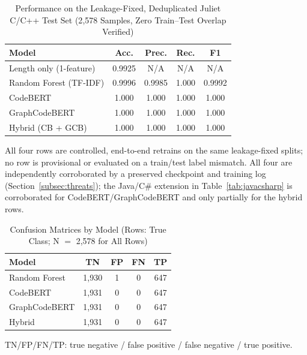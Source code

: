 \documentclass{ieeeaccess}
\begin{document}
\begin{table}[t]
\centering
\caption{Performance on the Leakage-Fixed, Deduplicated Juliet C/C++ Test Set (2{,}578 Samples, Zero Train--Test Overlap Verified)}
\label{tab:cpp-results}
\begin{tabular}{@{}lcccc@{}}
\toprule
\textbf{Model} & \textbf{Acc.} & \textbf{Prec.} & \textbf{Rec.} & \textbf{F1} \\
\midrule
Length only (1-feature)  & 0.9925 & N/A    & N/A   & N/A    \\
Random Forest (TF-IDF)    & 0.9996 & 0.9985 & 1.000 & 0.9992 \\
CodeBERT                  & 1.000  & 1.000  & 1.000 & 1.000  \\
GraphCodeBERT             & 1.000  & 1.000  & 1.000 & 1.000  \\
Hybrid (CB + GCB)         & 1.000  & 1.000  & 1.000 & 1.000  \\
\bottomrule
\end{tabular}

\vspace{2pt}
{\footnotesize All four rows are controlled, end-to-end retrains on the same leakage-fixed splits; no row is provisional or evaluated on a train/test label mismatch. All four are independently corroborated by a preserved checkpoint and training log (Section~\ref{subsec:threats}); the Java/C\# extension in Table~\ref{tab:javacsharp} is corroborated for CodeBERT/GraphCodeBERT and only partially for the hybrid rows.}
\end{table}

\begin{table}[t]
\centering
\caption{Confusion Matrices by Model (Rows: True Class; N $=$ 2{,}578 for All Rows)}
\label{tab:confusion}
\begin{tabular}{@{}lcccc@{}}
\toprule
\textbf{Model} & \textbf{TN} & \textbf{FP} & \textbf{FN} & \textbf{TP} \\
\midrule
Random Forest  & 1{,}930 & 1 & 0 & 647 \\
CodeBERT       & 1{,}931 & 0 & 0 & 647 \\
GraphCodeBERT  & 1{,}931 & 0 & 0 & 647 \\
Hybrid         & 1{,}931 & 0 & 0 & 647 \\
\bottomrule
\end{tabular}

\vspace{2pt}
{\footnotesize TN/FP/FN/TP: true negative / false positive / false negative / true positive.}
\end{table}
\end{document}
